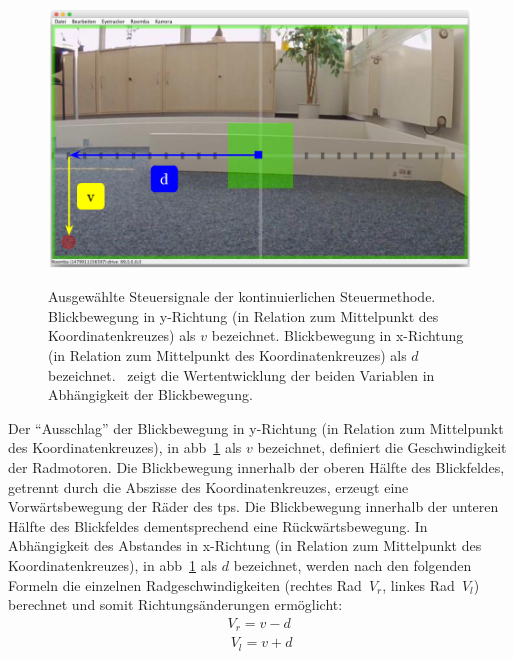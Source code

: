 \begin{figure}[ht]
\begin{minipage}[b]{.5\linewidth}
      \label{fig:3} 
   \end{minipage}%
   \hfill
   \begin{minipage}[b]{.5\linewidth} 
    \centering 
	\includegraphics[width=1\textwidth]{bilder/implementierung/linksDrive.png} 
      \label{fig:4} 
   \end{minipage}%
   \hfill
   \caption{Ausgewählte Steuersignale der kontinuierlichen Steuermethode. Blickbewegung in y-Richtung (in Relation zum Mittelpunkt des Koordinatenkreuzes) als $v$ bezeichnet. Blickbewegung in x-Richtung (in Relation zum Mittelpunkt des Koordinatenkreuzes) als $d$ bezeichnet. \textbf{}~zeigt die Wertentwicklung der beiden Variablen in Abhängigkeit der Blickbewegung.}\label{fig:allkontModus} 
\end{figure} 

Der \enquote{Ausschlag} der Blickbewegung in y-Richtung (in Relation zum Mittelpunkt des Koordinatenkreuzes), in \acs{abb}~\ref{fig:allkontModus} als $v$ bezeichnet, definiert die Geschwindigkeit der Radmotoren. Die Blickbewegung innerhalb der oberen Hälfte des Blickfeldes, getrennt durch die Abszisse des Koordinatenkreuzes, erzeugt eine Vorwärtsbewegung der Räder des \acs{tps}. Die Blickbewegung innerhalb der unteren Hälfte des Blickfeldes dementsprechend eine Rückwärtsbewegung. In Abhängigkeit des Abstandes in x-Richtung (in Relation zum Mittelpunkt des Koordinatenkreuzes), in \acs{abb}~\ref{fig:allkontModus} als $d$ bezeichnet, werden nach den folgenden Formeln die einzelnen Radgeschwindigkeiten (rechtes Rad~$V_{r}$, linkes Rad~$V_{l}$) berechnet und somit Richtungsänderungen ermöglicht:
\begin{equation}
\begin{split}
V_{r} = v - d \\\
V_{l} = v + d
\end{split}
\label{eq:formel}
\end{equation}

